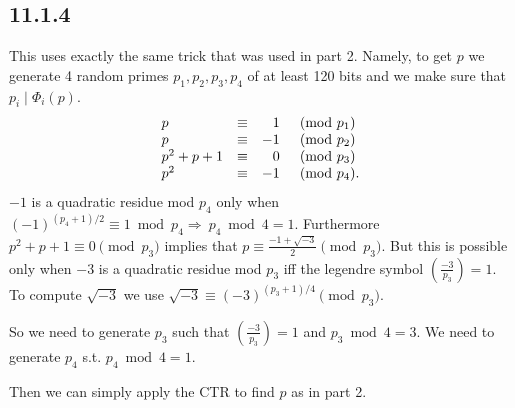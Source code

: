 \documentclass[12pt,a4paper]{article}
\newcommand {\thus}{\Rightarrow\:}
\begin{document}
    \subsection{11.1.4}
        This uses exactly the same trick that was used in part 2. Namely, to get $p$ we generate 4 random primes $p_1,p_2,p_3,p_4$ of at least 120 bits and we
        make sure that $p_i \mid \Phi_i(p)$.
        \[
            \begin{array}{l l r l}
                p &\equiv & 1 &\pmod{p_1}\\
                p &\equiv & -1&\pmod{p_2}\\
       p^2 + p + 1&\equiv & 0 &\pmod{p_3}\\
               p^2&\equiv & -1&\pmod{p_4}.\\
            \end{array}
        \]
        $-1$ is a quadratic residue mod $p_4$ only when $(-1)^{(p_4+1)/2} \equiv 1 \bmod{p_4} \thus p_4 \bmod 4 = 1$. 
        Furthermore $p^2 + p + 1 \equiv 0 \pmod{p_3}$ implies that $p \equiv \frac{-1 + \sqrt{-3}}{2} \pmod{p_3}$.
        But this is possible only when $-3$ is a quadratic residue mod $p_3$ iff the legendre symbol $\left( \frac{-3}{p_3}\right) = 1$.
        To compute $\sqrt{-3}$ we use $\sqrt{-3} \equiv (-3)^{(p_3+1)/4} \pmod{p_3}$.

        So we need to generate $p_3$ such that $(\frac{-3}{p_3}) = 1$ and $p_3 \bmod 4 = 3$. We need to generate $p_4$ s.t.
        $p_4 \bmod 4 = 1$.

        Then we can simply apply the CTR to find $p$ as in part 2.
\end{document}
